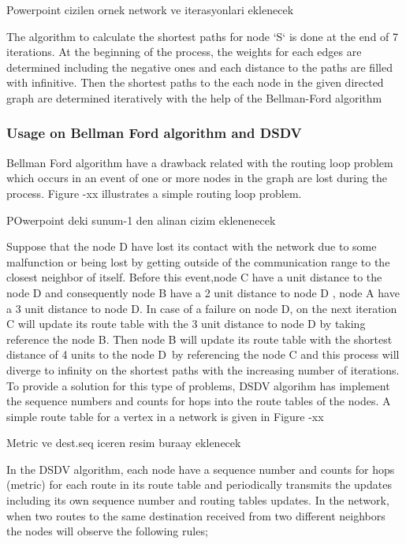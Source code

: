 \documentclass[twoside]{article}
\begin{document}
\begin{multicols}{2}
	Powerpoint cizilen ornek network ve iterasyonlari eklenecek
	
	The algorithm to calculate the shortest paths for node `S` is done at the end of 7 iterations. At the beginning of the process, the weights for each edges are determined including the negative ones and each distance to the paths are filled with infinitive. Then the shortest paths to the each node in the given directed graph are determined iteratively with the help of the Bellman-Ford algorithm 
	
	
	\subsubsection{Usage on Bellman Ford algorithm and DSDV}
	
	Bellman Ford algorithm have a drawback related with the routing loop problem which occurs in an event of one or more nodes in the graph are lost during the process. Figure -xx illustrates a simple routing loop problem. 
	
	POwerpoint deki sunum-1 den alinan cizim eklenenecek
	
	Suppose that the node D have lost its contact with the network due to some malfunction or being lost by getting outside of the communication range to the closest neighbor of itself. Before this event,node C have a unit distance to the node D and consequently node B have a 2 unit distance to node D , node A have a 3 unit distance to node D. In case of a failure on node D, on the next iteration C will update its route table with the 3 unit distance to node D by taking reference the node B. Then node B will update its route table with the shortest distance of 4 units to the node D\ by referencing the node C and this process will diverge to infinity on the shortest paths with the increasing number of iterations. To provide a solution for this type of problems, DSDV algorihm has implement the sequence numbers and counts for hops into the route tables of the nodes. A simple route table for a vertex in a network is given in Figure -xx
	
	Metric ve dest.seq iceren resim buraay eklenecek
	
	In the DSDV algorithm, each node have a sequence number and counts for hops (metric) for each route in its route table and periodically transmits the updates including its own sequence number and routing tables updates. In the network, when two routes to the same destination received from two different neighbors the nodes will observe the following rules;
	

\end{multicols}
\end{document}
